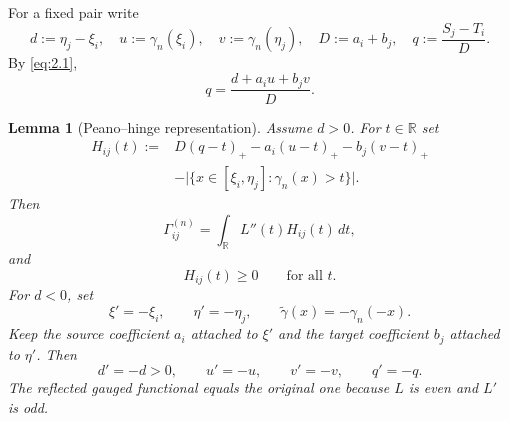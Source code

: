\documentclass[11pt,reqno]{amsart}
\newtheorem{lemma}[theorem]{Lemma}
\theoremstyle{definition}
\theoremstyle{remark}
\numberwithin{equation}{section}
\newcommand{\R}{\mathbb R}
\begin{document}
For a fixed pair write
\[
d:=\eta_j-\xi_i,\quad
u:=\gamma_n(\xi_i),\quad
v:=\gamma_n(\eta_j),\quad
D:=a_i+b_j,
\quad
q:=\frac{S_j-T_i}{D}.
\]
By \eqref{eq:2.1},
\begin{equation}
q=\frac{d+a_iu+b_jv}{D}.
\label{eq:2.3}
\end{equation}

\begin{lemma}[Peano--hinge representation]
\label{lem:hinge}
Assume \(d>0\).  For \(t\in\R\) set
\begin{equation}
\begin{aligned}
H_{ij}(t):={}&
D(q-t)_+-a_i(u-t)_+-b_j(v-t)_+\\
&-\bigl|\{x\in[\xi_i,\eta_j]:\gamma_n(x)>t\}\bigr|.
\end{aligned}
\label{eq:2.4}
\end{equation}
Then
\begin{equation}
\Gamma^{(n)}_{ij}
=\int_{\R}L''(t)H_{ij}(t)\,dt,
\label{eq:2.5}
\end{equation}
and
\begin{equation}
H_{ij}(t)\ge0\qquad\text{for all }t.
\label{eq:2.6}
\end{equation}
For \(d<0\), set
\[
\xi'=-\xi_i,\qquad \eta'=-\eta_j,\qquad
\widetilde\gamma(x)=-\gamma_n(-x).
\]
Keep the source coefficient \(a_i\) attached to \(\xi'\) and the target
coefficient \(b_j\) attached to \(\eta'\).  Then
\[
d'=-d>0,\qquad u'=-u,\qquad v'=-v,\qquad q'=-q.
\]
The reflected gauged functional equals the original one because \(L\) is
even and \(L'\) is odd.
\end{lemma}
\end{document}

